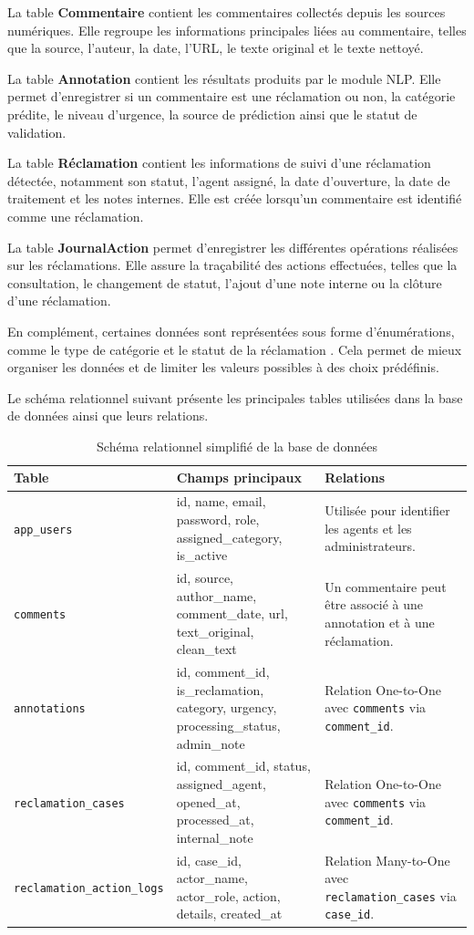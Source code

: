 \documentclass[12pt,a4paper,oneside]{report}
\begin{document}
La table \textbf{Commentaire} contient les commentaires collectés depuis les sources numériques. Elle regroupe les informations principales liées au commentaire, telles que la source, l’auteur, la date, l’URL, le texte original et le texte nettoyé.

La table \textbf{Annotation} contient les résultats produits par le module NLP. Elle permet d’enregistrer si un commentaire est une réclamation ou non, la catégorie prédite, le niveau d’urgence, la source de prédiction ainsi que le statut de validation.

La table \textbf{Réclamation} contient les informations de suivi d’une réclamation détectée, notamment son statut, l’agent assigné, la date d’ouverture, la date de traitement et les notes internes. Elle est créée lorsqu’un commentaire est identifié comme une réclamation.

La table \textbf{JournalAction} permet d’enregistrer les différentes opérations réalisées sur les réclamations. Elle assure la traçabilité des actions effectuées, telles que la consultation, le changement de statut, l’ajout d’une note interne ou la clôture d’une réclamation.

En complément, certaines données sont représentées sous forme d’énumérations, comme le type de catégorie et le statut de la réclamation . Cela permet de mieux organiser les données et de limiter les valeurs possibles à des choix prédéfinis.

Le schéma relationnel suivant présente les principales tables utilisées dans la base de données ainsi que leurs relations.

\begin{table}[H]
\centering
\small
\caption{Schéma relationnel simplifié de la base de données}
\begin{tabular}{|p{5cm}|p{5cm}|p{5cm}|}
\hline
\textbf{Table} & \textbf{Champs principaux} & \textbf{Relations} \\
\hline
\texttt{app\_users} & id, name, email, password, role, assigned\_category, is\_active & Utilisée pour identifier les agents et les administrateurs. \\
\hline
\texttt{comments} & id, source, author\_name, comment\_date, url, text\_original, clean\_text & Un commentaire peut être associé à une annotation et à une réclamation. \\
\hline
\texttt{annotations} & id, comment\_id, is\_reclamation, category, urgency, processing\_status, admin\_note & Relation One-to-One avec \texttt{comments} via \texttt{comment\_id}. \\
\hline
\texttt{reclamation\_cases} & id, comment\_id, status, assigned\_agent, opened\_at, processed\_at, internal\_note & Relation One-to-One avec \texttt{comments} via \texttt{comment\_id}. \\
\hline
\texttt{reclamation\_action\_logs} & id, case\_id, actor\_name, actor\_role, action, details, created\_at & Relation Many-to-One avec \texttt{reclamation\_cases} via \texttt{case\_id}. \\
\hline
\end{tabular}
\end{table}
\end{document}
